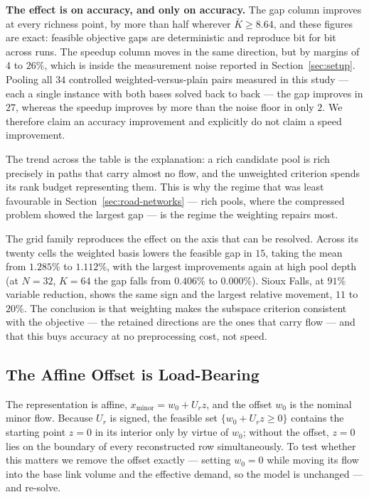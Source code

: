\documentclass[11pt]{article}
\begin{document}
\textbf{The effect is on accuracy, and only on accuracy.} The gap column improves at every
richness point, by more than half wherever $\bar K \ge 8.64$, and these figures are exact:
feasible objective gaps are deterministic and reproduce bit for bit across runs. The speedup
column moves in the same direction, but by margins of $4$ to $26\%$, which is inside the
measurement noise reported in Section~\ref{sec:setup}. Pooling all $34$ controlled
weighted-versus-plain pairs measured in this study --- each a single instance with both bases
solved back to back --- the gap improves in $27$, whereas the speedup improves by more than the
noise floor in only $2$. We therefore claim an accuracy improvement and explicitly do not claim
a speed improvement.

The trend across the table is the explanation: a rich candidate pool is rich precisely in paths
that carry almost no flow, and the unweighted criterion spends its rank budget representing
them. This is why the regime that was least favourable in Section~\ref{sec:road-networks} ---
rich pools, where the compressed problem showed the largest gap --- is the regime the weighting
repairs most.

The grid family reproduces the effect on the axis that can be resolved. Across its twenty cells
the weighted basis lowers the feasible gap in $15$, taking the mean from $1.285\%$ to
$1.112\%$, with the largest improvements again at high pool depth (at $N=32$, $K=64$ the gap
falls from $0.406\%$ to $0.000\%$). Sioux Falls, at $91\%$ variable reduction, shows the same
sign and the largest relative movement, $11$ to $20\%$. The conclusion is that weighting makes
the subspace criterion consistent with the objective --- the retained directions are the ones
that carry flow --- and that this buys accuracy at no preprocessing cost, not speed.

\subsection{The Affine Offset is Load-Bearing}
\label{sec:offset-study}


The representation is affine, $x_{\text{minor}}=w_0+U_rz$, and the offset $w_0$ is the
nominal minor flow. Because $U_r$ is signed, the feasible set $\{w_0+U_rz\ge0\}$ contains the
starting point $z=0$ in its interior only by virtue of $w_0$; without the offset, $z=0$ lies
on the boundary of every reconstructed row simultaneously. To test whether this matters we
remove the offset exactly --- setting $w_0=0$ while moving its flow into the base link volume
and the effective demand, so the model is unchanged --- and re-solve.
\end{document}
